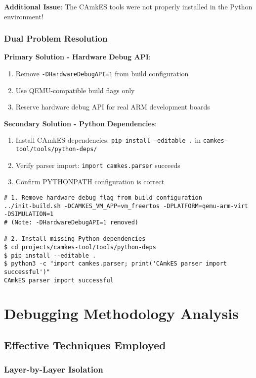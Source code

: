 \documentclass[11pt,a4paper]{article}
\begin{document}
\textbf{Additional Issue}: The CAmkES tools were not properly installed in the Python environment!

\subsubsection{Dual Problem Resolution}

\textbf{Primary Solution - Hardware Debug API}:
\begin{enumerate}
\item Remove \texttt{-DHardwareDebugAPI=1} from build configuration
\item Use QEMU-compatible build flags only
\item Reserve hardware debug API for real ARM development boards
\end{enumerate}

\textbf{Secondary Solution - Python Dependencies}:
\begin{enumerate}
\item Install CAmkES dependencies: \texttt{pip install --editable .} in \texttt{camkes-tool/tools/python-deps/}
\item Verify parser import: \texttt{import camkes.parser} succeeds
\item Confirm PYTHONPATH configuration is correct
\end{enumerate}

\begin{lstlisting}[caption=Dual Problem Resolution]
# 1. Remove hardware debug flag from build configuration
../init-build.sh -DCAMKES_VM_APP=vm_freertos -DPLATFORM=qemu-arm-virt -DSIMULATION=1
# (Note: -DHardwareDebugAPI=1 removed)

# 2. Install missing Python dependencies
$ cd projects/camkes-tool/tools/python-deps
$ pip install --editable .
$ python3 -c "import camkes.parser; print('CAmkES parser import successful')"
CAmkES parser import successful
\end{lstlisting}

\section{Debugging Methodology Analysis}

\subsection{Effective Techniques Employed}

\subsubsection{Layer-by-Layer Isolation}
\end{document}
